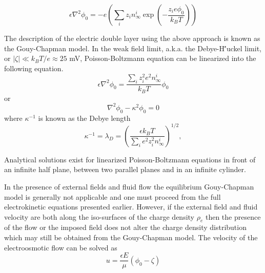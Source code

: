 \begin{equation}
\epsilon \nabla^2\phi_0 = - e \left(\sum_i z_i n_\infty^i \exp \left( -\frac{z_i e \phi_0}{k_BT} \right) \right)
\label{eq:poisson-boltzmann}
\end{equation}

The description of the electric double layer using the above approach is known as the Gouy-Chapman model\cite{ghosal2006electrokinetic}. In the weak field limit, a.k.a. the Debye-H\''{u}ckel limit, or $|\zeta|\ll k_BT/e\approx 25$ mV, Poisson-Boltzmann equation can be linearized into the following equation. 
\begin{equation}
\epsilon \nabla^2\phi_0 = \frac{\sum_i z_i^2 e^2 n_\infty^i}{k_BT} \phi_0
\end{equation}
or
\begin{equation} 
\nabla^2\phi_0 - \kappa^2 \phi_0 = 0
\end{equation}
where $\kappa^{-1}$ is known as the Debye length
\begin{equation}
\kappa^{-1}=\lambda_D=\left(\frac{\epsilon k_BT}{\sum_i e^2 z_i^2n_\infty^i}\right)^{1/2},
\end{equation}

Analytical solutions exist for linearized Poisson-Boltzmann equations in front of an infinite half plane, between two parallel planes and in an infinite cylinder\cite{ghosal2006electrokinetic,ghosal2010mathematical}.

In the presence of external fields and fluid flow the equilibrium Gouy-Chapman model is generally not applicable and one must proceed from the full electrokinetic equations presented earlier. However, if the external field and fluid velocity are both along the iso-surfaces of the charge density $\rho_e$ then the presence of the flow or the imposed field does not alter the charge density distribution which may still be obtained from the Gouy-Chapman model. The velocity of the electroosmotic flow can be solved as
\begin{equation}
u = \frac{\epsilon E}{\mu}\left(\phi_0 - \zeta\right)
\label{eq:classicu}
\end{equation}

